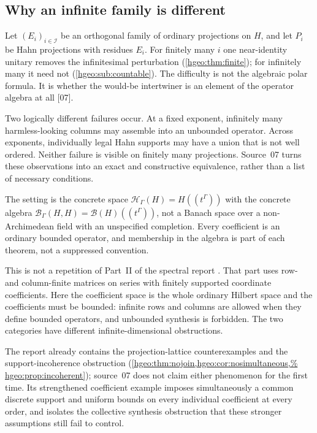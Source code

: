\documentclass[11pt,letterpaper]{article}
\numberwithin{equation}{section}
\theoremstyle{definition}
\theoremstyle{remark}
\newcommand{\HH}[1]{\mathscr H_\Gamma(#1)}
\newcommand{\BH}{\mathscr B_\Gamma(H,H)}
\newcommand{\src}[1]{\textup{\textsf{\small[#1]}}}
\begin{document}
\subsection{Why an infinite family is different}\label{hgeo:us:sub:why}
Let $(E_i)_{i\in\mathcal I}$ be an orthogonal family of ordinary projections
on $H$, and let $P_i$ be Hahn projections with residues $E_i$. For finitely
many $i$ one near-identity unitary removes the infinitesimal perturbation
(\cref{hgeo:thm:finite}); for infinitely many it need not
(\cref{hgeo:sub:countable}). The difficulty is not the algebraic polar
formula. It is whether the would-be intertwiner is an element of the operator
algebra at all \src{07}.

Two logically different failures occur. At a fixed exponent, infinitely many
harmless-looking columns may assemble into an unbounded operator. Across
exponents, individually legal Hahn supports may have a union that is not well
ordered. Neither failure is visible on finitely many projections. Source~07
turns these observations into an exact and constructive equivalence, rather
than a list of necessary conditions.

The setting is the concrete space $\HH{H}=H((t^\Gamma))$ with the concrete
algebra $\BH=\mathcal B(H)((t^\Gamma))$, not a Banach space over a
non-Archimedean field with an unspecified completion. Every coefficient is an
ordinary bounded operator, and membership in the algebra is part of each
theorem, not a suppressed convention.

This is not a repetition of Part~II of the spectral report
\cite{RepoSpectral}. That part uses row- and column-finite matrices on series
with finitely supported coordinate coefficients. Here the coefficient space
is the whole ordinary Hilbert space and the coefficients must be bounded:
infinite rows and columns are allowed when they define bounded operators, and
unbounded synthesis is forbidden. The two categories have different
infinite-dimensional obstructions.

The report already contains the projection-lattice counterexamples and the
support-incoherence obstruction (\cref{hgeo:thm:nojoin,hgeo:cor:nosimultaneous,%
hgeo:prop:incoherent}); source~07 does not claim either phenomenon for the
first time. Its strengthened coefficient example imposes simultaneously a
common discrete support and uniform bounds on every individual coefficient
at every order, and isolates the collective synthesis obstruction that these
stronger assumptions still fail to control.
\end{document}
